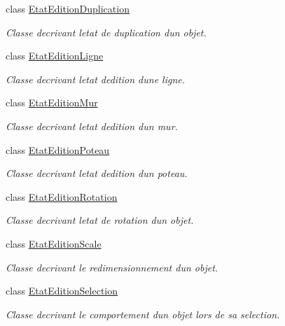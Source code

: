 \begin{DoxyCompactItemize}
class \hyperlink{class_interface_graphique_1_1_etat_edition_duplication}{Etat\+Edition\+Duplication}
\begin{DoxyCompactList}\small\item\em Classe decrivant l\textquotesingle{}etat de duplication d\textquotesingle{}un objet. \end{DoxyCompactList}\item 
class \hyperlink{class_interface_graphique_1_1_etat_edition_ligne}{Etat\+Edition\+Ligne}
\begin{DoxyCompactList}\small\item\em Classe decrivant l\textquotesingle{}etat d\textquotesingle{}edition d\textquotesingle{}une ligne. \end{DoxyCompactList}\item 
class \hyperlink{class_interface_graphique_1_1_etat_edition_mur}{Etat\+Edition\+Mur}
\begin{DoxyCompactList}\small\item\em Classe decrivant l\textquotesingle{}etat d\textquotesingle{}edition d\textquotesingle{}un mur. \end{DoxyCompactList}\item 
class \hyperlink{class_interface_graphique_1_1_etat_edition_poteau}{Etat\+Edition\+Poteau}
\begin{DoxyCompactList}\small\item\em Classe decrivant l\textquotesingle{}etat d\textquotesingle{}edition d\textquotesingle{}un poteau. \end{DoxyCompactList}\item 
class \hyperlink{class_interface_graphique_1_1_etat_edition_rotation}{Etat\+Edition\+Rotation}
\begin{DoxyCompactList}\small\item\em Classe decrivant l\textquotesingle{}etat de rotation d\textquotesingle{}un objet. \end{DoxyCompactList}\item 
class \hyperlink{class_interface_graphique_1_1_etat_edition_scale}{Etat\+Edition\+Scale}
\begin{DoxyCompactList}\small\item\em Classe decrivant le redimensionnement d\textquotesingle{}un objet. \end{DoxyCompactList}\item 
class \hyperlink{class_interface_graphique_1_1_etat_edition_selection}{Etat\+Edition\+Selection}
\begin{DoxyCompactList}\small\item\em Classe decrivant le comportement d\textquotesingle{}un objet lors de sa selection. \end{DoxyCompactList}\item 

\end{DoxyCompactItemize}
